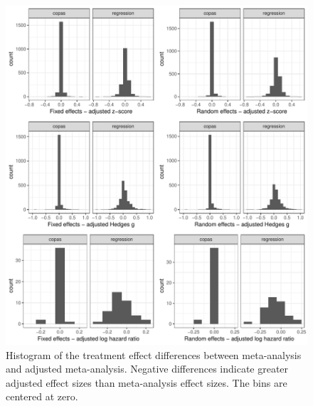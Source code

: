 \documentclass[11pt,a4paper,twoside]{book}\usepackage[]{graphicx}\usepackage[]{color}
\newenvironment{knitrout}{}{} %
\begin{document}
\begin{figure}
\begin{knitrout}
\color{fgcolor}

{\centering \includegraphics[width=\textwidth-3cm]{figure/ch03_figunnamed-chunk-13-1} 

}



\end{knitrout}
\caption{Histogram of the treatment effect differences between meta-analysis and adjusted meta-analysis. Negative differences indicate greater adjusted effect sizes than meta-analysis effect sizes. The bins are centered at zero.}
\label{fig:adjustment.size}
\end{figure}
\end{document}
